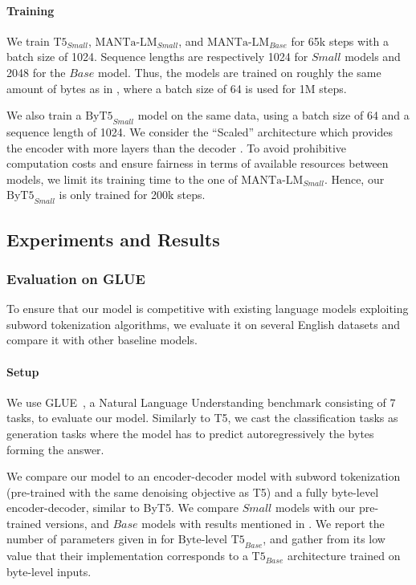 \paragraph{Training} We train $\text{T5}_{Small}$, $\text{MANTa-LM}_{Small}$, and $\text{MANTa-LM}_{Base}$ for 65k steps with a batch size of 1024. Sequence lengths are respectively 1024 for $Small$ models and 2048 for the $Base$ model. Thus, the models are trained on roughly the same amount of bytes as in \citet{tay2021charformer}, where a batch size of 64 is used for 1M steps. 

We also train a $\text{ByT5}_{Small}$ model on the same data, using a batch size of 64 and a sequence length of 1024. We consider the ``Scaled'' architecture which provides the encoder with more layers than the decoder \cite{xue2022byt5}. To avoid prohibitive computation costs and ensure fairness in terms of available resources between models, we limit its training time to the one of $\text{MANTa-LM}_{Small}$. Hence, our $\text{ByT5}_{Small}$ is only trained for 200k steps.



\subsection{Experiments and Results}
\subsubsection{Evaluation on GLUE}

To ensure that our model is competitive with existing language models exploiting subword tokenization algorithms, we evaluate it on several English datasets and compare it with other baseline models.

\paragraph{Setup} We use GLUE~\cite{wang-etal-2018-glue}, a Natural Language Understanding benchmark consisting of 7 tasks, to evaluate our model. Similarly to T5, we cast the classification tasks as generation tasks where the model has to predict autoregressively the bytes forming the answer. 

We compare our model to an encoder-decoder model with subword tokenization (pre-trained with the same denoising objective as T5) and a fully byte-level encoder-decoder, similar to ByT5. We compare $Small$ models with our pre-trained versions, and $Base$ models with results mentioned in \citet{tay2021charformer}. We report the number of parameters given in \citet{tay2021charformer} for $\text{Byte-level T5}_{Base}$, and gather from its low value that their implementation corresponds to a $\text{T5}_{Base}$ architecture trained on byte-level inputs. 

